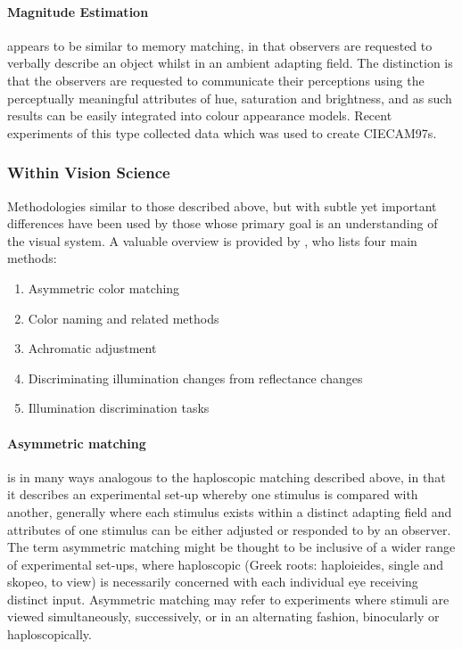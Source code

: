 \paragraph{Magnitude Estimation} appears to be similar to memory matching, in that observers are requested to verbally describe an object whilst in an ambient adapting field. The distinction is that the observers are requested to communicate their perceptions using the perceptually meaningful attributes of hue, saturation and brightness, and as such results can be easily integrated into colour appearance models. Recent experiments \citep{kuo_various_1995,xu_testing_1997,luo_quantifying_1991-1,luo_quantifying_1991,luo_quantifying_1993-1,luo_quantifying_1993} of this type collected data which was used to create CIECAM97s.

\subsubsection{Within Vision Science} \label{sec:methvis} 

Methodologies similar to those described above, but with subtle yet important differences have been used by those whose primary goal is an understanding of the visual system. A valuable overview is provided by \citet{foster_color_2011}, who lists four main methods:

\begin{enumerate}
\item Asymmetric color matching
\item Color naming and related methods
\item Achromatic adjustment
\item Discriminating illumination changes from reflectance changes
\item Illumination discrimination tasks
\end{enumerate}

\paragraph{Asymmetric matching} is in many ways analogous to the haploscopic matching described above, in that it describes an experimental set-up whereby one stimulus is compared with another, generally where each stimulus exists within a distinct adapting field and attributes of one stimulus can be either adjusted or responded to by an observer. The term asymmetric matching might be thought to be inclusive of a wider range of experimental set-ups, where haploscopic (Greek roots: haploieides, single and skopeo, to view) is necessarily concerned with each individual eye receiving distinct input. Asymmetric matching may refer to experiments where stimuli are viewed simultaneously, successively, or in an alternating fashion, binocularly or haploscopically.

